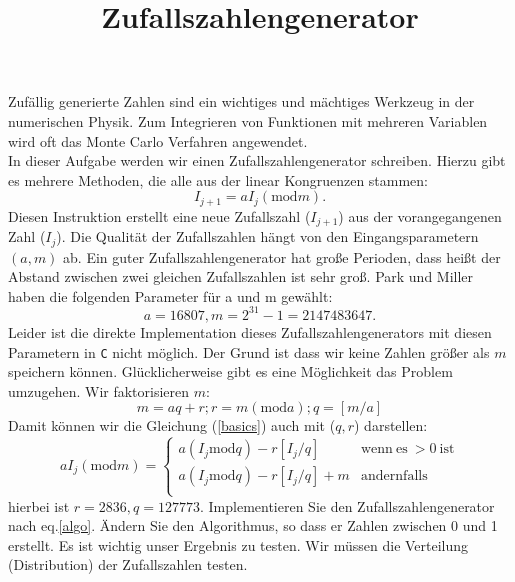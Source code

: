 \documentclass{article}[12pt]
\title{Zufallszahlengenerator}
\begin{document}
\maketitle
Zuf\"allig generierte Zahlen sind ein wichtiges und m\"achtiges Werkzeug in der numerischen Physik. Zum Integrieren von Funktionen mit mehreren Variablen wird oft das Monte Carlo Verfahren angewendet.\\
In dieser Aufgabe werden wir einen Zufallszahlengenerator schreiben. Hierzu gibt es mehrere Methoden, die alle aus der linear Kongruenzen stammen:
\begin{equation}
I_{j+1}=a I_{j} \left( \mathrm{mod} m\right).
\label{basics}
\end{equation}
Diesen Instruktion erstellt eine neue Zufallszahl ($I_{j+1}$) aus der vorangegangenen Zahl ($I_j$). Die Qualität der Zufallszahlen 
hängt von den Eingangsparametern $(a,m)$ ab. Ein guter Zufallszahlengenerator hat große Perioden, dass hei\ss{}t der Abstand zwischen zwei gleichen
Zufallszahlen ist sehr groß. Park und Miller haben die folgenden Parameter für a und m gewählt:
\begin{equation}
a=16807, m=2^{31}-1=2147483647. 
\end{equation}
Leider ist die direkte Implementation dieses Zufallszahlengenerators mit diesen Parametern in \texttt{C} nicht möglich. Der Grund ist
dass wir keine Zahlen größer als $m$ speichern können. Glücklicherweise gibt es eine Möglichkeit das Problem umzugehen. 
Wir faktorisieren $m$:
\begin{equation}
m= aq + r; r= m \left(\mathrm{mod}a\right); q= \left[m/a\right]
\end{equation}
Damit können wir die Gleichung (\ref{basics}) auch mit ($q,r$) darstellen:
\begin{equation}
a I_j \left( \mathrm{mod} m\right)=  
\left\{ \begin{array}{rc}
a\left(I_j \mathrm{mod} q\right) -r \left[I_j/q\right] & \mathrm{wenn~es~}>0~\mathrm{ist} \\ 
a\left(I_j \mathrm{mod} q\right) -r \left[I_j/q\right] + m & \mathrm{andernfalls} \\ 
\end{array}\right.
\label{algo}
\end{equation}
hierbei ist $r=2836,q=127773$. Implementieren Sie den Zufallszahlengenerator nach eq.\ref{algo}. Ändern Sie den Algorithmus, so dass er Zahlen zwischen 0 und 1 erstellt.
Es ist wichtig unser Ergebnis zu testen. Wir müssen die Verteilung (Distribution) der Zufallszahlen testen.
\end{document}
